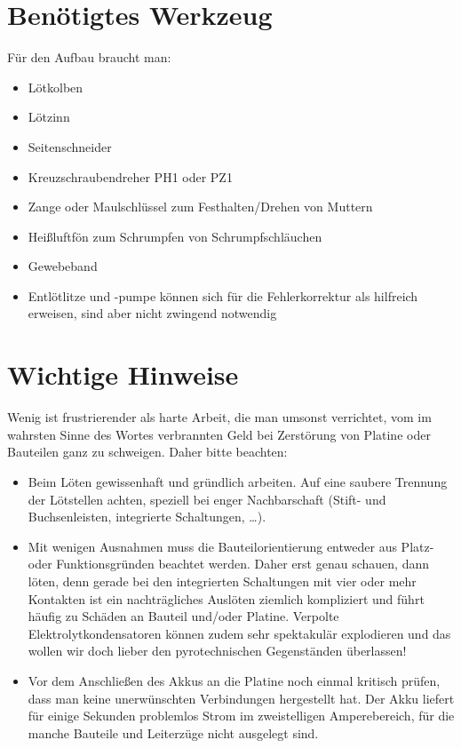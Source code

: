 \documentclass[paper=a4, open=any]{scrbook}
\begin{document}
			\section{Benötigtes Werkzeug}
				Für den Aufbau braucht man:
				\begin{itemize}
					\item Lötkolben
					\item Lötzinn
					\item Seitenschneider
					\item Kreuzschraubendreher PH1 oder PZ1
					\item Zange oder Maulschlüssel zum Festhalten/Drehen von Muttern
					\item Heißluftfön zum Schrumpfen von Schrumpfschläuchen
					\item Gewebeband
					\item Entlötlitze und -pumpe können sich für die Fehlerkorrektur als hilfreich erweisen, sind aber nicht zwingend notwendig
				\end{itemize}

			\section{Wichtige Hinweise}
				Wenig ist frustrierender als harte Arbeit, die man umsonst verrichtet, vom im wahrsten Sinne des Wortes verbrannten Geld bei Zerstörung von Platine oder Bauteilen ganz zu schweigen. Daher bitte beachten:
				\begin{itemize}
					\item Beim Löten gewissenhaft und gründlich arbeiten. Auf eine saubere Trennung der Lötstellen achten, speziell bei enger Nachbarschaft (Stift- und Buchsenleisten, integrierte Schaltungen, \dots).
					\item Mit wenigen Ausnahmen muss die Bauteilorientierung entweder aus Platz- oder Funktionsgründen beachtet werden. Daher erst genau schauen, dann löten, denn gerade bei den integrierten Schaltungen mit vier oder mehr Kontakten ist ein nachträgliches Auslöten ziemlich kompliziert und führt häufig zu Schäden an Bauteil und/oder Platine. Verpolte Elektrolytkondensatoren können zudem sehr spektakulär explodieren und das wollen wir doch lieber den pyrotechnischen Gegenständen überlassen!
					\item Vor dem Anschließen des Akkus an die Platine noch einmal kritisch prüfen, dass man keine unerwünschten Verbindungen hergestellt hat. Der Akku liefert für einige Sekunden problemlos Strom im zweistelligen Amperebereich, für die manche Bauteile und Leiterzüge nicht ausgelegt sind.
				\end{itemize}
\end{document}

